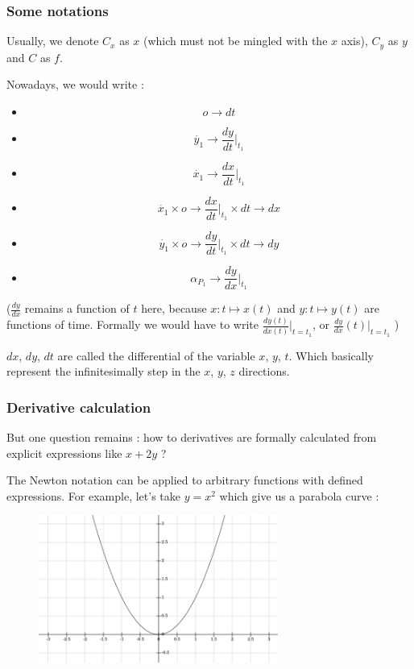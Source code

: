 \documentclass[12pt]{article}
\begin{document}
\subsubsection{Some notations}

Usually, we denote $C_x$ as $x$ (which must not be mingled with the $x$ axis), $C_y$ as $y$ and $C$ as $f$.

\bigskip

Nowadays, we would write :

\begin{itemize}
\item $$ o \rightarrow dt $$
\item $$ \dot{y_1} \rightarrow \frac{dy}{dt}|_{t_1} $$
\item $$ \dot{x_1} \rightarrow \frac{dx}{dt}|_{t_1} $$
\item $$ \dot{x_1} \times o \rightarrow \frac{dx}{dt}|_{t_1} \times dt  \rightarrow dx $$
\item $$ \dot{y_1} \times o \rightarrow \frac{dy}{dt}|_{t_1} \times dt  \rightarrow dy $$
\item $$ \alpha_{P_1} \rightarrow \frac{dy}{dx}|_{t_1} $$ 
\end{itemize}

($\frac{dy}{dx}$ remains a function of $t$ here, because $x: t \mapsto x(t)$ and $y: t \mapsto y(t)$ are functions of time. Formally we would have to write $\frac{dy(t)}{dx(t)}|_{t=t_1}$, or $\frac{dy}{dx}(t)|_{t=t_1}$ )

$dx$, $dy$, $dt$ are called the differential of the variable $x$, $y$, $t$. Which basically represent the infinitesimally step \cite{stackexchange_what_is_dx_integration} in the $x$, $y$, $z$ directions. 


\subsubsection{Derivative calculation}


But one question remains : how to derivatives are formally calculated from explicit expressions like $x + 2y$ ?

The Newton notation can be applied to arbitrary functions with defined expressions. For example, let's take $y = x^2$ which give us a parabola curve :

\begin{figure}[H]
\centering
\includegraphics[width=0.7\textwidth]{assets/images/SHTIxCkjCR.png}
\end{figure}
\end{document}
